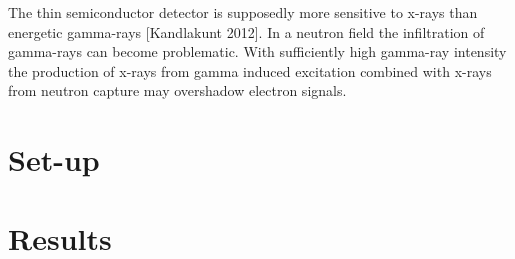 The thin semiconductor detector is supposedly more sensitive to x-rays than energetic gamma-rays [Kandlakunt 2012]. In a neutron field the infiltration of gamma-rays can become problematic. With sufficiently high gamma-ray intensity the production of x-rays from gamma induced excitation combined with x-rays from neutron capture may overshadow electron signals.

\section{Set-up}
\section{Results}
